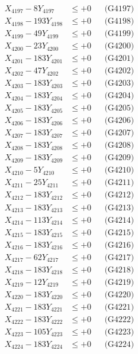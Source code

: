 \documentclass[a4paper,10pt]{article}
\begin{document}
{\begin{align}
X_{4197} - 8Y_{4197} &\leq +0 && \text{(G4197)} \\
X_{4198} - 193Y_{4198} &\leq +0 && \text{(G4198)} \\
X_{4199} - 49Y_{4199} &\leq +0 && \text{(G4199)} \\
X_{4200} - 23Y_{4200} &\leq +0 && \text{(G4200)} \\
\allowbreak
X_{4201} - 183Y_{4201} &\leq +0 && \text{(G4201)} \\
X_{4202} - 47Y_{4202} &\leq +0 && \text{(G4202)} \\
X_{4203} - 183Y_{4203} &\leq +0 && \text{(G4203)} \\
X_{4204} - 183Y_{4204} &\leq +0 && \text{(G4204)} \\
X_{4205} - 183Y_{4205} &\leq +0 && \text{(G4205)} \\
X_{4206} - 183Y_{4206} &\leq +0 && \text{(G4206)} \\
X_{4207} - 183Y_{4207} &\leq +0 && \text{(G4207)} \\
X_{4208} - 183Y_{4208} &\leq +0 && \text{(G4208)} \\
X_{4209} - 183Y_{4209} &\leq +0 && \text{(G4209)} \\
X_{4210} - 5Y_{4210} &\leq +0 && \text{(G4210)} \\
\allowbreak
X_{4211} - 25Y_{4211} &\leq +0 && \text{(G4211)} \\
X_{4212} - 183Y_{4212} &\leq +0 && \text{(G4212)} \\
X_{4213} - 183Y_{4213} &\leq +0 && \text{(G4213)} \\
X_{4214} - 113Y_{4214} &\leq +0 && \text{(G4214)} \\
X_{4215} - 183Y_{4215} &\leq +0 && \text{(G4215)} \\
X_{4216} - 183Y_{4216} &\leq +0 && \text{(G4216)} \\
X_{4217} - 62Y_{4217} &\leq +0 && \text{(G4217)} \\
X_{4218} - 183Y_{4218} &\leq +0 && \text{(G4218)} \\
X_{4219} - 12Y_{4219} &\leq +0 && \text{(G4219)} \\
X_{4220} - 183Y_{4220} &\leq +0 && \text{(G4220)} \\
\allowbreak
X_{4221} - 183Y_{4221} &\leq +0 && \text{(G4221)} \\
X_{4222} - 183Y_{4222} &\leq +0 && \text{(G4222)} \\
X_{4223} - 105Y_{4223} &\leq +0 && \text{(G4223)} \\
X_{4224} - 183Y_{4224} &\leq +0 && \text{(G4224)} \\

\end{align}}
\end{document}
